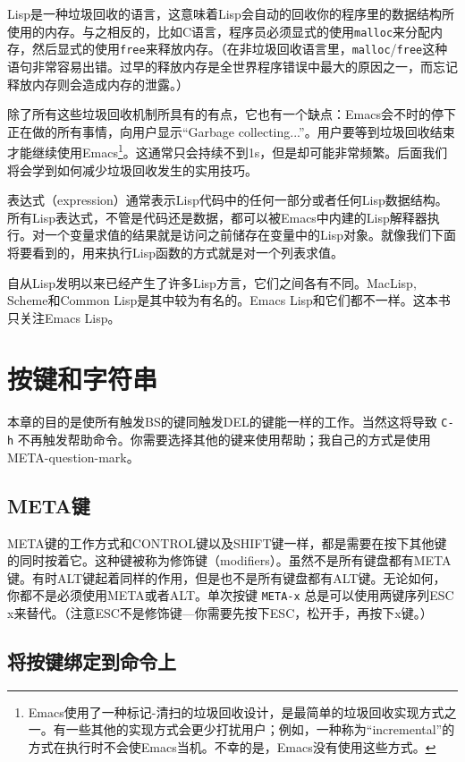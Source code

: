 Lisp是一种垃圾回收的语言，这意味着Lisp会自动的回收你的程序里的数据结构所使用的内存。与之相反的，比如C语言，程序员必须显式的使用\texttt{malloc}来分配内存，然后显式的使用\texttt{free}来释放内存。（在非垃圾回收语言里，\texttt{malloc}/\texttt{free}这种语句非常容易出错。过早的释放内存是全世界程序错误中最大的原因之一，而忘记释放内存则会造成内存的泄露。）

除了所有这些垃圾回收机制所具有的有点，它也有一个缺点：Emacs会不时的停下正在做的所有事情，向用户显示“Garbage collecting...”。用户要等到垃圾回收结束才能继续使用Emacs\footnote{Emacs使用了一种标记-清扫的垃圾回收设计，是最简单的垃圾回收实现方式之一。有一些其他的实现方式会更少打扰用户；例如，一种称为“incremental”的方式在执行时不会使Emacs当机。不幸的是，Emacs没有使用这些方式。}。这通常只会持续不到1s，但是却可能非常频繁。后面我们将会学到如何减少垃圾回收发生的实用技巧。

表达式（expression）通常表示Lisp代码中的任何一部分或者任何Lisp数据结构。所有Lisp表达式，不管是代码还是数据，都可以被Emacs中内建的Lisp解释器执行。对一个变量求值的结果就是访问之前储存在变量中的Lisp对象。就像我们下面将要看到的，用来执行Lisp函数的方式就是对一个列表求值。

自从Lisp发明以来已经产生了许多Lisp方言，它们之间各有不同。MacLisp, Scheme和Common Lisp是其中较为有名的。Emacs Lisp和它们都不一样。这本书只关注Emacs Lisp。

\section{按键和字符串}
\label{section:01-Keys-and-Strings}

本章的目的是使所有触发BS的键同触发DEL的键能一样的工作。当然这将导致 \verb|C-h| 不再触发帮助命令。你需要选择其他的键来使用帮助；我自己的方式是使用META-question-mark。

\subsection{META键}
\label{section:01-The-META-Key}

META键的工作方式和CONTROL键以及SHIFT键一样，都是需要在按下其他键的同时按着它。这种键被称为修饰键（modifiers）。虽然不是所有键盘都有META键。有时ALT键起着同样的作用，但是也不是所有键盘都有ALT键。无论如何，你都不是必须使用META或者ALT。单次按键 \verb|META-x| 总是可以使用两键序列ESC x来替代。（注意ESC不是修饰键---你需要先按下ESC，松开手，再按下x键。）

\subsection{将按键绑定到命令上}
\label{section:01-Bindings-Keystrokes-to-Commands}

